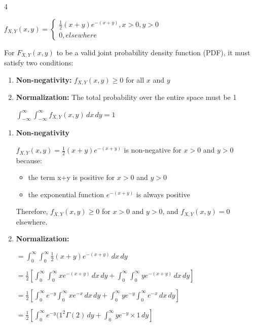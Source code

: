 \documentclass[12 pt]{article}
\begin{document}
    \begin{exercise}{4}
    \hfill

    $f_{X,Y}(x,y) = \begin{cases}
        \frac{1}{2} (x+y) e^{-(x+y)}, x>0, y>0 \\
        0, elsewhere       
    \end{cases}$

    For $F_{X,Y}(x,y)$ to be a valid joint probability density function (PDF), it must satisfy two conditions:
    \begin{enumerate}
        \item \textbf{Non-negativity:} $f_{X,Y}(x,y) \geq 0$ for all $x$ and $y$
        \item \textbf{Normalization:} The total probability over the entire space must be 1

        $\int_{-\infty}^{\infty} \int_{-\infty}^{\infty} f_{X,Y}(x,y) \, dx \, dy = 1$
    \end{enumerate}

    \hfill

    \begin{enumerate}
        \item \textbf{Non-negativity}

        $f_{X,Y}(x,y) = \frac{1}{2}(x+y)e^{-(x+y)}$ is non-negative for $x > 0$ and $y > 0$ because:
        \begin{itemize}
            \item the term x+y is positive for $x>0$ and $y>0$
            \item the exponential function $e^{-(x+y)}$ is always positive
        \end{itemize}
        Therefore, $f_{X,Y}(x,y) \geq 0$ for $x>0$ and $y>0$, and $f_{X,Y}(x,y) = 0$ elsewhere.

        \item \textbf{Normalization:}

        $= \int_{0}^{\infty} \int_{0}^{\infty} \frac{1}{2}(x+y) e^{-(x+y)} \, dx \, dy$

        $= \frac{1}{2}[\int_{0}^{\infty} \int_{0}^{\infty} x e^{-(x+y)} \, dx \, dy + \int_{0}^{\infty} \int_{0}^{\infty} y e^{-(x+y)} \, dx \, dy]$

        $= \frac{1}{2}[\int_{0}^{\infty} e^{-y} \int_{0}^{\infty} xe^{-x} \, dx \, dy + \int_{0}^{\infty} ye^{-y} \int_{0}^{\infty} e^{-x} \, dx \, dy]$

        $= \frac{1}{2}[\int_{0}^{\infty} e^{-y} (1^2 \Gamma(2) \, dy + \int_{0}^{\infty} ye^{-y} \times 1 \, dy]$


\end{enumerate}
\end{exercise}
\end{document}
